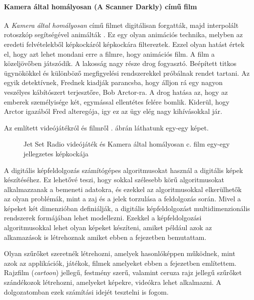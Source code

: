 \paragraph{Kamera által homályosan (A Scanner Darkly) című film} 

A \textit{Kamera által homályosan} című filmet digitálisan forgatták, majd interpolált rotoszkóp segítségével animálták \cite{scannerdarkly}\cite{porthu}. Ez egy olyan animációs technika, melyben az eredeti felvételekből képkockáról képkockára filtereztek. Ezzel olyan hatást értek el, hogy azt lehet mondani erre a filmre, hogy animációs film. A film a közeljövőben játszódik. A lakosság nagy része drog fogyasztó. Beépített titkos ügynökökkel és különböző megfigyelési rendszerekkel próbálnak rendet tartani. Az egyik detektívnek, Frednek kiadják parancsba, hogy álljon rá egy nagyon veszélyes kábítószert terjesztőre, Bob Arctor-ra. A drog hatása az, hogy az emberek személyisége két, egymással ellentétes felére bomlik. Kiderül, hogy Arctor igazából Fred alteregója, igy ez az ügy elég nagy kihívásokkal jár. 

Az említett videójátékról és filmről . ábrán láthatunk egy-egy képet.

\begin{figure}[ht]
\centering
{}
\caption{Jet Set Radio videójáték és Kamera által homályosan c. film egy-egy jellegzetes képkockája} 
\label{fig:jetset}
\end{figure}


A digitális képfeldolgozás számítógépes algoritmusokat használ a digitális képek készítéséhez. Ez lehetővé teszi, hogy sokkal szélesebb körű algoritmusokat alkalmazzanak a bemeneti adatokra, és ezekkel az algoritmusokkal elkerülhetők az olyan problémák, mint a zaj és a jelek torzulása a feldolgozás során. Mivel a képeket két dimenzióban definiálják, a digitális képfeldolgozást multidimenzionális rendszerek formájában lehet modellezni.  Ezekkel a képfeldolgozási algoritmusokkal lehet olyan képeket készíteni, amiket például azok az alkamazások is létrehoznak amiket ebben a fejezetben bemutattam.



Olyan szűrőket szeretnék létrehozni, amelyek hasonlóképpen működnek, mint azok az applikációk, játékok, filmek amelyeket ebben a fejezetben említettem. Rajzfilm (\textit{cartoon}) jellegű, festmény szerű, valamint ceruza rajz jellegű szűrőket szándékozok létrehozni, amelyeket képekre, videókra lehet alkalmazni. A dolgozatomban ezek számítási idejét tesztelni is fogom.
